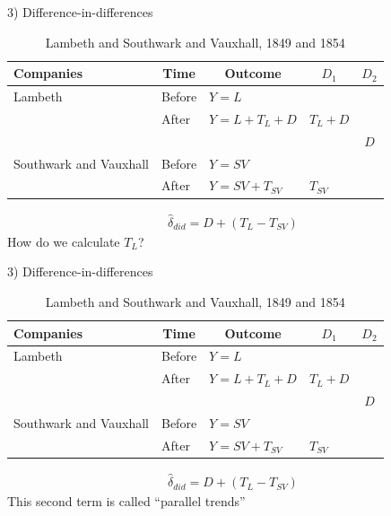 \documentclass{beamer}
\begin{document}
\begin{frame}{3) Difference-in-differences}

\begin{table}\centering
		\caption{Lambeth and Southwark and Vauxhall, 1849 and 1854}
		\begin{center}
		\begin{tabular}{lll|lc}
		\toprule
		\multicolumn{1}{l}{\textbf{Companies}}&
		\multicolumn{1}{c}{\textbf{Time}}&
		\multicolumn{1}{c}{\textbf{Outcome}}&
		\multicolumn{1}{c}{$D_1$}&
		\multicolumn{1}{c}{$D_2$}\\
		\midrule
		Lambeth & Before & $Y=L$ \\
		& After & $Y=L + T_L + D$ & $T_L+D$\\
		\midrule
		& & & & $D$ \\
		\midrule
		Southwark and Vauxhall & Before & $Y=SV$ \\
		& After & $Y=SV + T_{SV}$ & $T_{SV}$\\
		\bottomrule
		\end{tabular}
		\end{center}
	\end{table}

\begin{eqnarray*}
\widehat{\delta}_{did} = D + (T_L - T_{SV})
\end{eqnarray*}How do we calculate $T_{L}$?  

\end{frame}


\begin{frame}{3) Difference-in-differences}

\begin{table}\centering
		\caption{Lambeth and Southwark and Vauxhall, 1849 and 1854}
		\begin{center}
		\begin{tabular}{lll|lc}
		\toprule
		\multicolumn{1}{l}{\textbf{Companies}}&
		\multicolumn{1}{c}{\textbf{Time}}&
		\multicolumn{1}{c}{\textbf{Outcome}}&
		\multicolumn{1}{c}{$D_1$}&
		\multicolumn{1}{c}{$D_2$}\\
		\midrule
		Lambeth & Before & $Y=L$ \\
		& After & $Y=L + T_L + D$ & $T_L+D$\\
		\midrule
		& & & & $D$ \\
		\midrule
		Southwark and Vauxhall & Before & $Y=SV$ \\
		& After & $Y=SV + T_{SV}$ & $T_{SV}$\\
		\bottomrule
		\end{tabular}
		\end{center}
	\end{table}

\begin{eqnarray*}
\widehat{\delta}_{did} = D + (T_L - T_{SV})
\end{eqnarray*}This second term is called ``parallel trends''

\end{frame}
\end{document}
